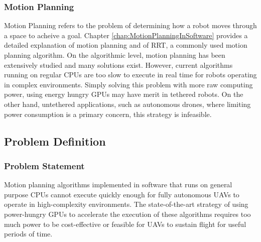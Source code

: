         

    \subsubsection*{Motion Planning}
        
        Motion Planning refers to the problem of determining how a robot moves through a space to acheive a goal. Chapter \ref{chap:MotionPlanningInSoftware} provides a detailed explanation of motion planning and of \ac{RRT}, a commonly used motion planning algorithm.
        \newline
        On the algorithmic level, motion planning has been extensively studied and many solutions exist. However, current algorithms running on regular \ac{CPU}s are too slow to execute in real time for robots operating in complex environments. Simply solving this problem with more raw computing power, using energy hungry \ac{GPU}s may have merit in tethered robots. On the other hand, untethered applications, such as autonomous drones, where limiting power consumption is a primary concern, this strategy is infeasible.
        

\newpage
\subsection{Problem Definition}

    \subsubsection*{Problem Statement}
    Motion planning algorithms implemented in software that runs on general purpose \ac{CPU}s cannot execute quickly enough for fully autonomous \ac{UAV}s to operate in high-complexity environments. The state-of-the-art strategy of using power-hungry \ac{GPU}s to accelerate the execution of these algorithms requires too much power to be cost-effective or feasible for \ac{UAV}s to sustain flight for useful periods of time. 

